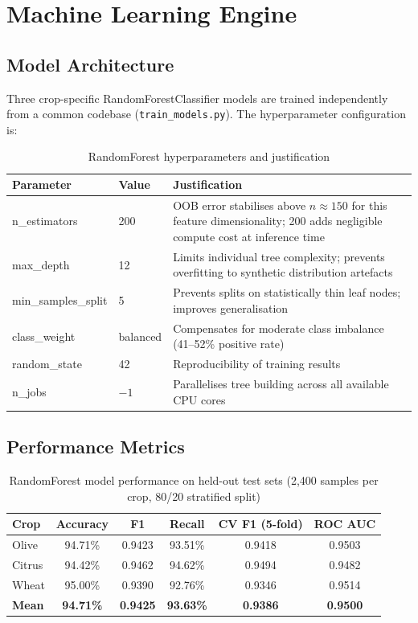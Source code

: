 \documentclass[12pt,a4paper]{report}
\begin{document}
\section{Machine Learning Engine}

\subsection{Model Architecture}

Three crop-specific RandomForestClassifier models are trained independently from a common codebase (\texttt{train\_models.py}). The hyperparameter configuration is:

\begin{table}[H]
\centering
\caption{RandomForest hyperparameters and justification}
\label{tab:rfparams}
\begin{tabularx}{\textwidth}{llX}
\toprule
\textbf{Parameter} & \textbf{Value} & \textbf{Justification} \\
\midrule
n\_estimators   & 200         & OOB error stabilises above $n \approx 150$ for this feature dimensionality; 200 adds negligible compute cost at inference time \\
max\_depth      & 12          & Limits individual tree complexity; prevents overfitting to synthetic distribution artefacts \\
min\_samples\_split & 5       & Prevents splits on statistically thin leaf nodes; improves generalisation \\
class\_weight   & balanced    & Compensates for moderate class imbalance (41--52\% positive rate) \\
random\_state   & 42          & Reproducibility of training results \\
n\_jobs         & $-1$        & Parallelises tree building across all available CPU cores \\
\bottomrule
\end{tabularx}
\end{table}

\subsection{Performance Metrics}

\begin{table}[H]
\centering
\caption{RandomForest model performance on held-out test sets (2,400 samples per crop, 80/20 stratified split)}
\label{tab:perf}
\begin{tabular}{lccccc}
\toprule
\textbf{Crop} & \textbf{Accuracy} & \textbf{F1} & \textbf{Recall} & \textbf{CV F1 (5-fold)} & \textbf{ROC AUC} \\
\midrule
Olive  & 94.71\% & 0.9423 & 93.51\% & 0.9418 & 0.9503 \\
Citrus & 94.42\% & 0.9462 & 94.62\% & 0.9494 & 0.9482 \\
Wheat  & 95.00\% & 0.9390 & 92.76\% & 0.9346 & 0.9514 \\
\midrule
\textbf{Mean} & \textbf{94.71\%} & \textbf{0.9425} & \textbf{93.63\%} & \textbf{0.9386} & \textbf{0.9500} \\
\bottomrule
\end{tabular}
\end{table}
\end{document}
